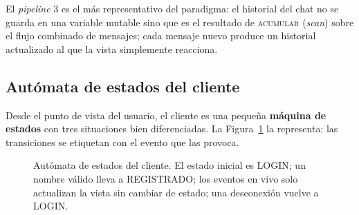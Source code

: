 \documentclass[12pt,a4paper]{article}
\begin{document}
El \textit{pipeline} 3 es el más representativo del paradigma: el historial del chat no se guarda en una variable mutable sino que es el resultado de \textsc{acumular} (\textit{scan}) sobre el flujo combinado de mensajes; cada mensaje nuevo produce un historial actualizado al que la vista simplemente reacciona.

\subsection{Autómata de estados del cliente}
\label{sec:automata}

Desde el punto de vista del usuario, el cliente es una pequeña \textbf{máquina de estados} con tres situaciones bien diferenciadas. La Figura~\ref{fig:automata} la representa: las transiciones se etiquetan con el evento que las provoca.

\begin{figure}[H]
\centering
{}
\caption{Autómata de estados del cliente. El estado inicial es LOGIN; un nombre válido lleva a REGISTRADO; los eventos en vivo solo actualizan la vista sin cambiar de estado; una desconexión vuelve a LOGIN.}
\label{fig:automata}
\end{figure}
\end{document}
